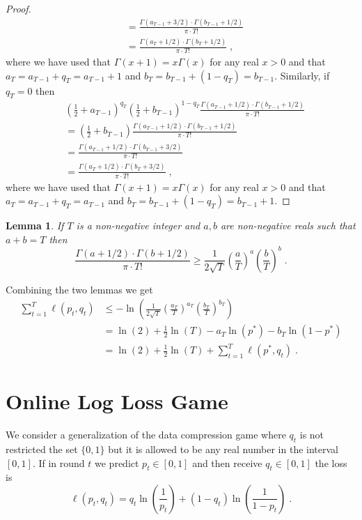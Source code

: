 \documentclass{article}
\newtheorem{lemma}[theorem]{Lemma}
\begin{document}
\begin{proof}
\begin{align*}
& = \frac{\Gamma(a_{T-1} + 3/2) \cdot \Gamma(b_{T-1} + 1/2)}{\pi \cdot T!} \\
& = \frac{\Gamma(a_{T} + 1/2) \cdot \Gamma(b_T + 1/2)}{\pi \cdot T!} \; ,
\end{align*}
where we have used that $\Gamma(x+1) = x \Gamma(x)$ for any real $x > 0$ and that $a_T = a_{T-1} + q_T = a_{T-1} + 1$ and $b_T = b_{T-1} + (1-q_T) = b_{T-1}$.
Similarly, if $q_T = 0$ then
\begin{align*}
& \left( \frac{1}{2} + a_{T-1} \right)^{q_T} \left( \frac{1}{2} + b_{T-1} \right)^{1-q_T} \frac{\Gamma(a_{T-1} + 1/2) \cdot \Gamma(b_{T-1} + 1/2)}{\pi \cdot T!} \\
& = \left( \frac{1}{2} + b_{T-1} \right) \frac{\Gamma(a_{T-1} + 1/2) \cdot \Gamma(b_{T-1} + 1/2)}{\pi \cdot T!} \\
& = \frac{\Gamma(a_{T-1} + 1/2) \cdot \Gamma(b_{T-1} + 3/2)}{\pi \cdot T!} \\
& = \frac{\Gamma(a_T + 1/2) \cdot \Gamma(b_T + 3/2)}{\pi \cdot T!} \; ,
\end{align*}
where we have used that $\Gamma(x+1) = x \Gamma(x)$ for any real $x > 0$ and that $a_T = a_{T-1} + q_T = a_{T-1}$ and $b_T = b_{T-1} + (1-q_T) = b_{T-1} + 1$.
\end{proof}

\begin{lemma}
If $T$ is a non-negative integer and $a,b$ are non-negative reals such that $a +
b = T$ then
$$
\frac{\Gamma(a + 1/2) \cdot \Gamma(b + 1/2)}{\pi \cdot T!} \ge \frac{1}{2\sqrt{T}} \left( \frac{a}{T} \right)^a \left( \frac{b}{T} \right)^b \; .
$$
\end{lemma}

Combining the two lemmas we get
\begin{align*}
\sum_{t=1}^T \ell(p_t, q_t)
& \le - \ln \left( \frac{1}{2\sqrt{T}} \left( \frac{a_T}{T} \right)^{a_T} \left( \frac{b_T}{T} \right)^{b_T} \right) \\
& = \ln(2) + \frac{1}{2} \ln(T) - a_T \ln (p^*) - b_T \ln (1-p^*) \\
& = \ln(2) + \frac{1}{2} \ln(T) + \sum_{t=1}^T \ell(p^*, q_t) \; .
\end{align*}

\section{Online Log Loss Game}
\label{section:log-loss}

We consider a generalization of the data compression game where $q_t$ is not
restricted the set $\{0,1\}$ but it is allowed to be any real number in the
interval $[0,1]$. If in round $t$ we predict $p_t \in [0,1]$ and then receive
$q_t \in [0,1]$ the loss is
$$
\ell(p_t, q_t) = q_t \ln\left( \frac{1}{p_t}\right) + (1-q_t) \ln  \left( \frac{1}{1 - p_t} \right) \; .
$$
\end{document}
